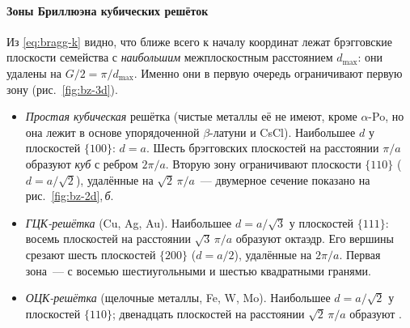 \paragraph{Зоны Бриллюэна кубических решёток}
Из \eqref{eq:bragg-k} видно, что ближе всего к началу координат лежат
брэгговские плоскости семейства с \emph{наибольшим} межплоскостным
расстоянием $d_\text{max}$: они удалены на $G/2=\pi/d_\text{max}$.
Именно они в первую очередь ограничивают первую зону
(рис.~\ref{fig:bz-3d}).
\begin{itemize}
\item \emph{Простая кубическая} решётка (чистые металлы её не имеют,
кроме $\alpha$-Po, но она лежит в основе упорядоченной $\beta$-латуни и
CsCl). Наибольшее $d$ у плоскостей $\{100\}$: $d=a$. Шесть брэгговских
плоскостей на расстоянии $\pi/a$ образуют \emph{куб} с ребром $2\pi/a$.
Вторую зону ограничивают плоскости $\{110\}$ ($d=a/\sqrt2$), удалённые
на $\sqrt2\,\pi/a$~— двумерное сечение показано на
рис.~\ref{fig:bz-2d},\,\textit{б}.
\item \emph{ГЦК-решётка} (Cu, Ag, Au). Наибольшее $d=a/\sqrt3$ у
плоскостей $\{111\}$: восемь плоскостей на расстоянии $\sqrt3\,\pi/a$
образуют октаэдр. Его вершины срезают шесть плоскостей $\{200\}$
($d=a/2$), удалённые на $2\pi/a$. Первая зона~—
 с восемью шестиугольными и шестью квадратными
гранями.
\item \emph{ОЦК-решётка} (щелочные металлы, Fe, W, Mo). Наибольшее
$d=a/\sqrt2$ у плоскостей $\{110\}$; двенадцать плоскостей на расстоянии
$\sqrt2\,\pi/a$ образуют .
\end{itemize}

